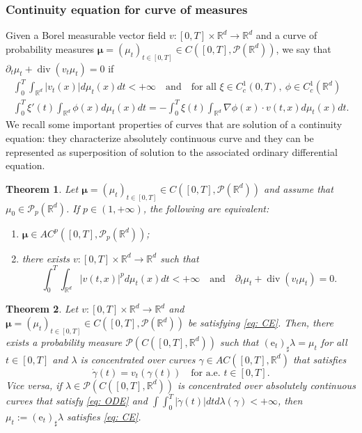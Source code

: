 \documentclass[10pt,leqno]{amsart}
\numberwithin{equation}{section}
\newtheorem{teorema}{Theorem}[section]
\newcommand{\R}{\mathbb{R}}
\newcommand{\PP}{\mathcal{P}}
\newcommand{\e}{\mathrm{e}}
\begin{document}
\subsubsection{Continuity equation for curve of measures}
Given a Borel measurable vector field $v:[0,T]\times \R^d \to \R^d$ and a curve of probability measures $\boldsymbol{\mu} = (\mu_t)_{t\in[0,T]} \in C([0,T],\PP(\R^d))$, we say that $\partial_t \mu_t + \operatorname{div}(v_t\mu_t) = 0$ if 
    \begin{equation}\label{eq: CE}
    \begin{aligned}
        \int_0^T \int_{\R^d} |v_t(x)|d\mu_t(x) dt <+\infty \quad \text{and} \quad \text{for all }\xi\in C_c^1(0,T), \ \phi \in C_c^1(\R^d)
        \\
        \int_0^T \xi'(t) \int_{\R^d} \phi(x) d\mu_t(x) dt = - \int_0^T \xi(t) \int_{\R^d} \nabla \phi(x) \cdot v(t,x) d\mu_t(x) dt.
    \end{aligned}   
    \end{equation}
We recall some important properties of curves that are solution of a continuity equation: they characterize absolutely continuous curve and they can be represented as superposition of solution to the associated ordinary differential equation. 

\begin{teorema}\cite[Theorem 8.3.1]{ambrosio2005gradient}
    Let $\boldsymbol{\mu} = (\mu_t)_{t\in[0,T]}\in C([0,T],\PP(\R^d)) $ and assume that $\mu_0 \in \PP_p(\R^d)$. If $p\in(1,+\infty)$, the following are equivalent:
    \begin{enumerate}
        \item $\boldsymbol{\mu}\in AC^p([0,T],\PP_p(\R^d))$;
        \item there exists $v:[0,T]\times \R^d \to \R^d$ such that 
        \begin{equation}
            \int_0^T \int_{\R^d}|v(t,x)|^pd\mu_t(x) dt <+\infty \quad \text{and} \quad \partial_t\mu_t + \operatorname{div}(v_t\mu_t) = 0.
        \end{equation}
    \end{enumerate}
\end{teorema}

\begin{teorema}\label{thm: superposition}\cite[Theorem 8.2.1]{ambrosio2005gradient}
    Let $v:[0,T]\times \R^d \to \R^d$ and $\boldsymbol{\mu} = (\mu_t)_{t\in[0,T]} \in C([0,T],\PP(\R^d))$ be satisfying \eqref{eq: CE}. Then, there exists a probability measure $\PP(C([0,T],\R^d))$ such that $(\e_t)_\sharp\lambda = \mu_t$ for all $t\in[0,T]$ and $\lambda$ is concentrated over curves $\gamma\in AC([0,T],\R^d)$ that satisfies 
    \begin{equation}\label{eq: ODE}
        \dot{\gamma}(t) = v_t(\gamma(t)) \quad \text{for a.e. }t\in[0,T].
    \end{equation}
    Vice versa, if $\lambda\in \PP(C([0,T],\R^d))$ is concentrated over absolutely continuous curves that satisfy \eqref{eq: ODE} and $\int \int_0^T |\dot\gamma(t)| dt d\lambda(\gamma)<+\infty$, then $\mu_t := (\e_t)_\sharp\lambda$ satisfies \eqref{eq: CE}.
\end{teorema}
\end{document}
